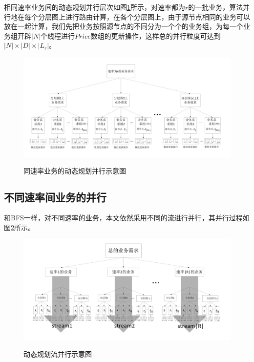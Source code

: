 相同速率业务间的动态规划并行层次如图\ref{dbs}所示，对速率都为$r$的一批业务，算法并行地在每个分层图上进行路由计算，在各个分层图上，由于源节点相同的业务可以放在一起计算，我们先把业务按照源节点的不同分为一个个的业务组，为每一个业务组开辟$|N|$个线程进行$Price$数组的更新操作，这样总的并行粒度可达到$|N|\times|D|\times|L_r|$。
\begin{figure}
\setlength{\abovecaptionskip}{-0.5cm}
\begin{center}
{\includegraphics[width=1 \textwidth]{figures/DRK.pdf}}
\end{center}
\caption{{\footnotesize{同速率业务的动态规划并行示意图}}}
\label{dbs}
\end{figure}
\subsection{不同速率间业务的并行}
和BFS一样，对不同速率的业务，本文依然采用不同的流进行并行，其并行过程如图\ref{BBK}所示。
\begin{figure}
\setlength{\abovecaptionskip}{-0.5cm}
\begin{center}
{\includegraphics[width=1 \textwidth]{figures/BBK.pdf}}
\end{center}
\caption{{\footnotesize{动态规划流并行示意图}}}
\label{BBK}
\end{figure}
